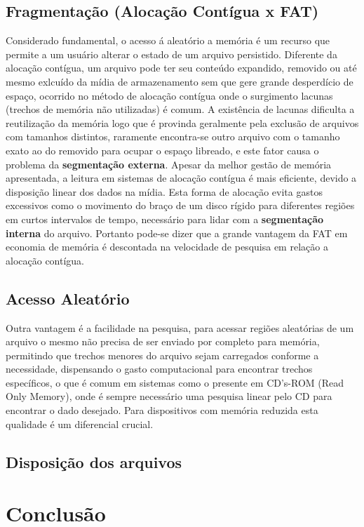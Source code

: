 \documentclass{article}
\begin{document}
\subsection{Fragmentação (Alocação Contígua x FAT)} 
	Considerado fundamental, o acesso á aleatório a memória é um recurso que permite a um usuário alterar o estado de um arquivo persistido. Diferente da alocação contígua, um arquivo pode ter seu conteúdo expandido, removido ou até mesmo exlcuído da mídia de armazenamento sem que gere grande desperdício de espaço, ocorrido no método de alocação contígua onde o surgimento lacunas (trechos de memória não utilizadas) é comum. A existência de lacunas dificulta a reutilização da memória logo que é provinda geralmente pela exclusão de arquivos com tamanhos distintos, raramente encontra-se outro arquivo com o tamanho exato ao do removido para ocupar o espaço libreado, e este fator causa o problema da \textbf{segmentação externa}. 
	Apesar da melhor gestão de memória apresentada, a leitura em sistemas de alocação contígua é mais eficiente, devido a disposição linear dos dados na mídia. Esta forma de alocação evita gastos excessivos como o movimento do braço de um disco rígido para diferentes regiões em curtos intervalos de tempo, necessário para lidar com a \textbf{segmentação interna} do arquivo. Portanto pode-se dizer que a grande vantagem da FAT em economia de memória é descontada na velocidade de pesquisa em relação a alocação contígua. 

\subsection{Acesso Aleatório} 
	Outra vantagem é a facilidade na pesquisa, para acessar regiões aleatórias de um arquivo o mesmo não precisa de ser enviado por completo para memória, permitindo que trechos menores do arquivo sejam carregados conforme a necessidade, dispensando o gasto computacional para encontrar trechos específicos, o que é comum em sistemas como o presente em CD's-ROM (Read Only Memory), onde é sempre necessário uma pesquisa linear pelo CD para encontrar o dado desejado. Para dispositivos com memória reduzida esta qualidade é um diferencial crucial. 

\subsection{Disposição dos arquivos}
    
\section{Conclusão}
    
\end{document}
